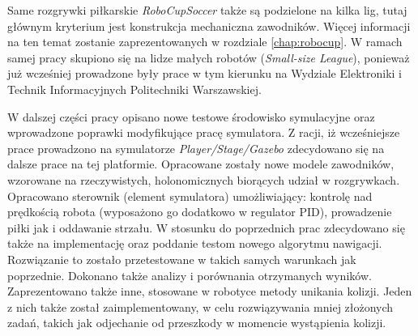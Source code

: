 Same rozgrywki piłkarskie \emph{RoboCupSoccer} także są podzielone na kilka lig, tutaj głównym kryterium jest konstrukcja mechaniczna zawodników. Więcej informacji na ten temat zostanie zaprezentowanych w rozdziale
\ref{chap:robocup}. W ramach samej pracy skupiono się na lidze małych robotów (\emph{Small-size League}), ponieważ już wcześniej prowadzone były prace w tym kierunku na Wydziale Elektroniki i 
Technik Informacyjnych Politechniki Warszawskiej.

W dalszej części pracy opisano nowe testowe środowisko symulacyjne oraz wprowadzone poprawki modyfikujące pracę symulatora.
Z racji, iż wcześniejsze prace prowadzono na symulatorze \emph{Player/Stage/Gazebo} zdecydowano się na dalsze prace na tej platformie.
Opracowane zostały nowe modele zawodników, wzorowane na rzeczywistych, holonomicznych
biorących udział w rozgrywkach. Opracowano sterownik (element symulatora) umożliwiający: kontrolę nad prędkością robota (wyposażono go dodatkowo w regulator PID), prowadzenie piłki jak i oddawanie strzału.
 W stosunku do poprzednich prac zdecydowano się także na implementację oraz poddanie testom nowego algorytmu nawigacji.  Rozwiązanie to zostało przetestowane w takich samych warunkach 
jak poprzednie. Dokonano także analizy i porównania otrzymanych wyników. Zaprezentowano także inne, stosowane w robotyce metody unikania kolizji. Jeden z nich także został zaimplementowany, w celu
rozwiązywania mniej złożonych zadań, takich jak odjechanie od przeszkody w momencie wystąpienia kolizji.

